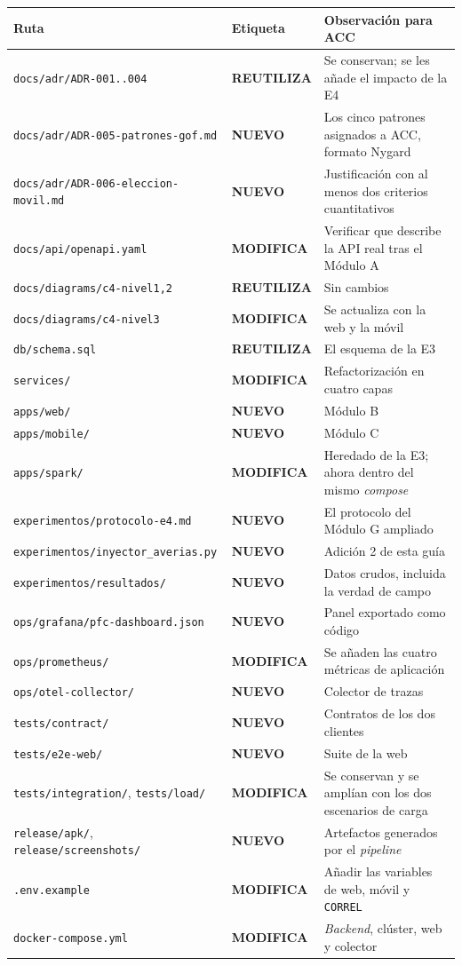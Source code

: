 \documentclass[11pt,a4paper]{article}
\newcommand{\reuso}{\cellcolor{filaReuso}\textbf{REUTILIZA}}
\newcommand{\cambia}{\cellcolor{filaCambia}\textbf{MODIFICA}}
\newcommand{\nuevo}{\cellcolor{filaNuevo}\textbf{NUEVO}}
\begin{document}
\begin{center}
	\footnotesize
	\begin{longtable}{@{}p{5.4cm}p{1.9cm}p{7.5cm}@{}}
		\toprule
		\textbf{Ruta} & \textbf{Etiqueta} & \textbf{Observación para ACC} \\
		\midrule
		\endhead
		\texttt{docs/adr/ADR-001..004} & \reuso & Se conservan; se les añade el impacto de la E4 \\
		\texttt{docs/adr/ADR-005-\allowbreak patrones-gof.md} & \nuevo & Los cinco patrones asignados a ACC, formato Nygard \\
		\texttt{docs/adr/ADR-006-\allowbreak eleccion-movil.md} & \nuevo & Justificación con al menos dos criterios cuantitativos \\
		\texttt{docs/api/openapi.yaml} & \cambia & Verificar que describe la API real tras el Módulo A \\
		\texttt{docs/diagrams/c4-nivel1,2} & \reuso & Sin cambios \\
		\texttt{docs/diagrams/c4-nivel3} & \cambia & Se actualiza con la web y la móvil \\
		\texttt{db/schema.sql} & \reuso & El esquema de la E3 \\
		\texttt{services/} & \cambia & Refactorización en cuatro capas \\
		\texttt{apps/web/} & \nuevo & Módulo B \\
		\texttt{apps/mobile/} & \nuevo & Módulo C \\
		\texttt{apps/spark/} & \cambia & Heredado de la E3; ahora dentro del mismo \emph{compose} \\
		\texttt{experimentos/\allowbreak protocolo-e4.md} & \nuevo & El protocolo del Módulo G ampliado \\
		\texttt{experimentos/\allowbreak inyector\_averias.py} & \nuevo & Adición 2 de esta guía \\
		\texttt{experimentos/resultados/} & \nuevo & Datos crudos, incluida la verdad de campo \\
		\texttt{ops/grafana/\allowbreak pfc-dashboard.json} & \nuevo & Panel exportado como código \\
		\texttt{ops/prometheus/} & \cambia & Se añaden las cuatro métricas de aplicación \\
		\texttt{ops/otel-collector/} & \nuevo & Colector de trazas \\
		\texttt{tests/contract/} & \nuevo & Contratos de los dos clientes \\
		\texttt{tests/e2e-web/} & \nuevo & Suite de la web \\
		\texttt{tests/integration/},\allowbreak{} \texttt{tests/load/} & \cambia & Se conservan y se amplían con los dos escenarios de carga \\
		\texttt{release/apk/},\allowbreak{} \texttt{release/screenshots/} & \nuevo & Artefactos generados por el \emph{pipeline} \\
		\texttt{.env.example} & \cambia & Añadir las variables de web, móvil y \texttt{CORREL} \\
		\texttt{docker-compose.yml} & \cambia & \emph{Backend}, clúster, web y colector \\
		\bottomrule
	\end{longtable}
\end{center}
\end{document}
